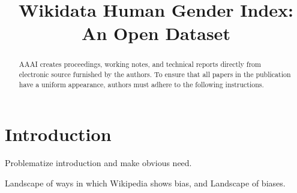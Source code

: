 \documentclass[letterpaper]{article}
\begin{document}
%
\title{Wikidata Human Gender Index: An Open Dataset}
\author{%
   \vfil {} \vfil \alignauthor{%
    }
    }	
    
\maketitle
\begin{abstract}
AAAI creates proceedings, working notes, and technical reports directly from electronic source furnished by the authors. To ensure that all papers in the publication have a uniform appearance, authors must adhere to the following instructions. 
\end{abstract}


\section{Introduction}
Problematize introduction and make obvious need.

Landscape of ways in which Wikipedia shows bias, and Landscape of biases.
\end{document}
